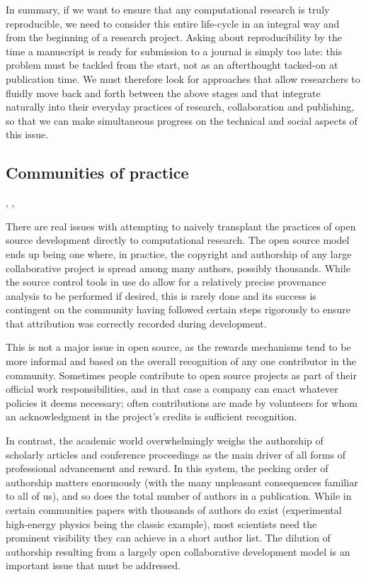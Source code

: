 \documentclass[ChapterTOCs,krantz2]{krantz} %
\theoremstyle{definition}
\begin{document}
In summary, if we want to ensure that any computational research is truly
reproducible, we need to consider this entire life-cycle in an integral way and
from the beginning of a research project.  Asking about reproducibility by the
time a manuscript is ready for submission to a journal is simply too late: this
problem must be tackled from the start, not as an afterthought tacked-on at
publication time.  We must therefore look for approaches that allow researchers
to fluidly move back and forth between the above stages and that integrate
naturally into their everyday practices of research, collaboration and
publishing, so that we can make simultaneous progress on the technical and
social aspects of this issue.

\subsection{Communities of practice}
\cite{turk2013scale}, \cite{joyner2007open}, \cite{prlic2012ten}

There are real issues with attempting to naively transplant the practices of
open source development directly to computational research. The open source
model ends up being one where, in practice, the copyright and authorship of any
large collaborative project is spread among many authors, possibly thousands.
While the source control tools in use do allow for a relatively precise
provenance analysis to be performed if desired, this is rarely done and its
success is contingent on the community having followed certain steps rigorously
to ensure that attribution was correctly recorded during development.

This is not a major issue in open source, as the rewards mechanisms tend to be
more informal and based on the overall recognition of any one contributor in
the community. Sometimes people contribute to open source projects as part of
their official work responsibilities, and in that case a company can enact
whatever policies it deems necessary; often contributions are made by
volunteers for whom an acknowledgment in the project's credits is sufficient
recognition.

In contrast, the academic world overwhelmingly weighs the authorship of
scholarly articles and conference proceedings as the main driver of all forms
of professional advancement and reward. In this system, the pecking order of
authorship matters enormously (with the many unpleasant consequences familiar
to all of us), and so does the total number of authors in a publication. While
in certain communities papers with thousands of authors do exist (experimental
high-energy physics being the classic example), most scientists need the
prominent visibility they can achieve in a short author list. The dilution of
authorship resulting from a largely open collaborative development model is an
important issue that must be addressed.
\end{document}
